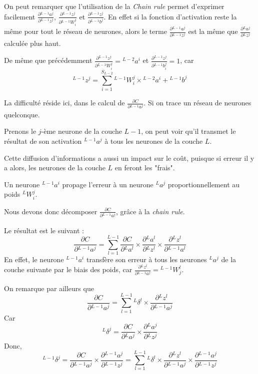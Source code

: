 \documentclass[a4paper, 11pt]{report}
\newcommand{\lexp}[1]{\phantom{}^{#1}}
\newcommand{\elem}[4]{\lexp{#2}#1^{#3}_{#4}}
\begin{document}
On peut remarquer que l'utilisation de la \emph{Chain rule} permet d'exprimer facilement $\frac{\partial \elem{a}{L-1}{j}{}}{\partial \elem{z}{L-1}{j}{}}$, $\frac{\partial \elem{z}{L-1}{j}{}}{\partial \elem{W}{L-1}{j}{i}}$ et $\frac{\partial \elem{z}{L-1}{j}{}}{\partial \elem{b}{L-1}{j}{}}$.
En effet si la fonction d'activation reste la même pour tout le réseau de neurones, alors le terme $\frac{\partial \elem{a}{L-1}{j}{}}{\partial \elem{z}{L-1}{j}{}}$ est la même que $\frac{\partial \elem{a}{L}{j}{}}{\partial \elem{z}{L}{j}{}}$ calculée plus haut.

De même que précédemment $\frac{\partial \elem{z}{L-1}{j}{}}{\partial \elem{W}{L-1}{j}{i}}=\elem{a}{L-2}{i}{}$ et $\frac{\partial \elem{z}{L-1}{j}{}}{\partial \elem{b}{L-1}{j}{i}} = 1$, car
$$\elem{z}{L-1}{j}{} = \sum_{i=1}^{S_{L-2}}{\elem{W}{L-1}{j}{i} \times \elem{a}{L-2}{i}{}} + \elem{b}{L-1}{j}{}$$
				
La difficulté réside ici, dans le calcul de $\frac{\partial C}{\partial \elem{a}{L-1}{j}{}}$.
Si on trace un réseau de neurones quelconque.

Prenons le $j$-ème neurone de la couche $L-1$, on peut voir qu'il transmet le résultat de son activation $\elem{a}{L-1}{j}{}$ à tous les neurones de la couche $L$.

Cette diffusion d'informations a aussi un impact sur le coût, puisque si erreur il y a alors, les neurones de la couche $L$ en feront les "frais".

Un neurone $\elem{a}{L-1}{i}{}$ propage l'erreur à un neurone $\elem{a}{L}{j}{}$ proportionnellement au poids $\elem{W}{L}{j}{i}$.
				
Nous devons donc décomposer $\frac{\partial C}{\partial \elem{a}{L-1}{j}{}}$, grâce à la \emph{chain rule}.
				
Le résultat est le suivant :	
$$\frac{\partial C}{\partial \elem{a}{L-1}{j}{}} = \sum_{l=1}^{L-1}{\frac{\partial C}{\partial \elem{a}{L}{l}{}} \times \frac{\partial \elem{a}{L}{l}{}}{\partial \elem{z}{L}{l}{}} \times \frac{\partial \elem{z}{L}{l}{}}{\partial \elem{a}{L-1}{l}{}}}$$
En effet, le neurone $\elem{a}{L-1}{i}{}$ transfère son erreur à tous les neurones $\elem{a}{L}{j}{}$ de la couche suivante par le biais des poids, car $\frac{\partial \elem{z}{L}{l}{}}{\partial \elem{a}{L-1}{j}{}} = \elem{W}{L-1}{l}{j}$.

On remarque par ailleurs que 
$$\frac{\partial C}{\partial \elem{a}{L-1}{j}{}} = \sum_{l=1}^{L-1}{\elem{\delta}{L}{l}{} \times \frac{\partial \elem{z}{L}{l}{}}{\partial \elem{a}{L-1}{j}{}}}$$
Car $$\elem{\delta}{L}{j}{} = \frac{\partial C}{\partial \elem{a}{L}{j}{}} \times \frac{\partial \elem{a}{L}{j}{}}{\partial \elem{z}{L}{j}{}}$$
Donc,
$$\elem{\delta}{L-1}{j}{} = \frac{\partial C}{\partial \elem{a}{L-1}{j}{}}  \times \frac{\partial \elem{a}{L-1}{j}{}}{\partial \elem{z}{L-1}{j}{}} = \sum_{l=1}^{L-1}{\elem{\delta}{L}{l}{} \times \frac{\partial \elem{z}{L}{l}{}}{\partial \elem{a}{L-1}{j}{}}} \times \frac{\partial \elem{a}{L-1}{j}{}}{\partial \elem{z}{L-1}{j}{}}$$
				
\end{document}
